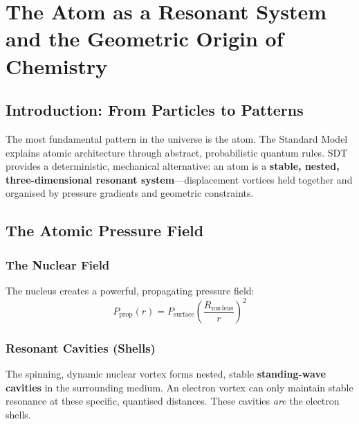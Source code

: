 \chapter{The Atom as a Resonant System and the Geometric Origin of Chemistry}

\author{James Tyndall}

\section{Introduction: From Particles to Patterns}

The most fundamental pattern in the universe is the atom.  The Standard Model explains atomic architecture through abstract, probabilistic quantum rules.  SDT provides a deterministic, mechanical alternative: an atom is a \textbf{stable, nested, three-dimensional resonant system}---displacement vortices held together and organised by pressure gradients and geometric constraints.


\section{The Atomic Pressure Field}

\subsection{The Nuclear Field}

The nucleus creates a powerful, propagating pressure field:
\begin{equation}\label{eq:P-nuc}
  P_{\text{prop}}(r) = P_{\text{surface}} \left(\frac{R_{\text{nucleus}}}{r}\right)^2
\end{equation}

\subsection{Resonant Cavities (Shells)}

The spinning, dynamic nuclear vortex forms nested, stable \textbf{standing-wave cavities} in the surrounding medium.  An electron vortex can only maintain stable resonance at these specific, quantised distances.  These cavities \emph{are} the electron shells.

